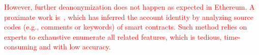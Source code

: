 \textcolor{red}{However, further deanonymization does not happen as expected in Ethereum. A proximate work is~\cite{chen2018infocom}, which has inferred the account identity by analyzing source codes (e.g., comments or keywords) of smart contracts. Such method relies on experts to exhaustive enumerate all related features, which is tedious, time-consuming and with low accuracy.}






